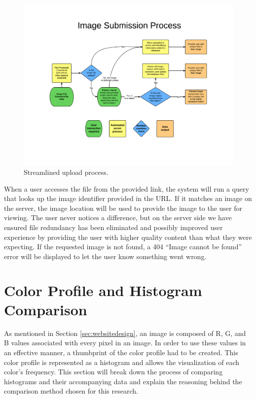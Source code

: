\begin{figure}[htbp]
\centering
\includegraphics[trim={3cm 3.5cm 2cm 4.2cm},clip, width=6in]{upproc}
\caption{Streamlined upload process.}
\label{method-fig1}
\end{figure}

When a user accesses the file from the provided link, the system will run a query that looks up the image identifier provided in the URL. If it matches an image on the server, the image location will be used to provide the image to the user for viewing. The user never notices a difference, but on the server side we have ensured file redundancy has been eliminated and possibly improved user experience by providing the user with higher quality content than what they were expecting. If the requested image is not found, a 404 ``Image cannot be found'' error will be displayed to let the user know something went wrong.

\section{Color Profile and Histogram Comparison} \label{sec:histogram}
As mentioned in Section \ref{sec:websitedesign}, an image is composed of R, G, and B values associated with every pixel in an image. In order to use these values in an effective manner, a thumbprint of the color profile had to be created. This color profile is represented as a histogram and allows the visualization of each color's frequency. This section will break down the process of comparing histograms and their accompanying data and explain the reasoning behind the comparison method chosen for this research.


